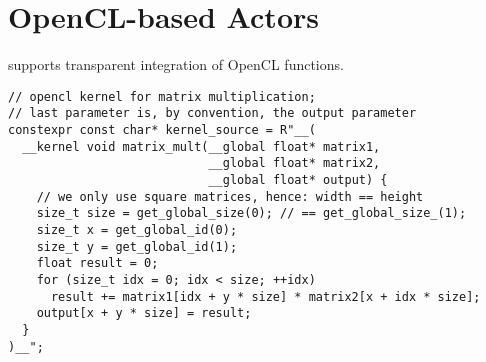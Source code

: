 \section{OpenCL-based Actors}

\lib supports transparent integration of OpenCL functions.


\begin{lstlisting}
// opencl kernel for matrix multiplication;
// last parameter is, by convention, the output parameter
constexpr const char* kernel_source = R"__(
  __kernel void matrix_mult(__global float* matrix1,
                            __global float* matrix2,
                            __global float* output) {
    // we only use square matrices, hence: width == height
    size_t size = get_global_size(0); // == get_global_size_(1);
    size_t x = get_global_id(0);
    size_t y = get_global_id(1);
    float result = 0;
    for (size_t idx = 0; idx < size; ++idx)
      result += matrix1[idx + y * size] * matrix2[x + idx * size];
    output[x + y * size] = result;
  }
)__";
\end{lstlisting}


